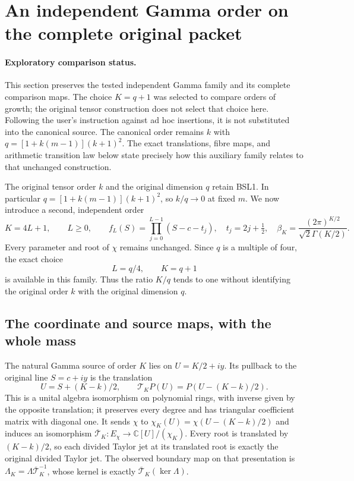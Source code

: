 \section{An independent Gamma order on the complete original packet}
\label{sec:IKO}

\paragraph{Exploratory comparison status.}
This section preserves the tested independent Gamma family and its
complete comparison maps. The choice $K=q+1$ was selected to compare
orders of growth; the original tensor construction does not select
that choice here. Following the user's instruction against ad hoc
insertions, it is not substituted into the canonical source. The
canonical order remains $k$ with $q=[1+k(m-1)](k+1)^2$.
The exact translations, fibre maps, and arithmetic transition law
below state precisely how this auxiliary family relates to that
unchanged construction.

The original tensor order $k$ and the original dimension $q$ retain
BSL1. In particular $q=[1+k(m-1)](k+1)^2$, so $k/q\to0$ at
fixed $m$. We now introduce a second, independent order
\[
 K=4L+1,\qquad L\geq0,\qquad
 f_L(S)=\prod_{j=0}^{L-1}(S-c-t_j),\quad t_j=2j+\tfrac12,
 \quad \beta_K=\frac{(2\pi)^{K/2}}{\sqrt2\Gamma(K/2)}.
 \tag{IKO1}
\]
Every parameter and root of $\chi$ remains unchanged. Since $q$ is a
multiple of four, the exact choice
\[
 L=q/4,\qquad K=q+1
 \tag{IKO2}
\]
is available in this family. Thus the ratio $K/q$ tends to one without
identifying the original order $k$ with the original dimension $q$.

\subsection{The coordinate and source maps, with the whole mass}
The natural Gamma source of order $K$ lies on $U=K/2+iy$.
Its pullback to the original line $S=c+iy$ is the translation
\[
 U=S+(K-k)/2,\qquad
 \mathcal T_KP(U)=P(U-(K-k)/2).
 \tag{IKO3}
\]
This is a unital algebra isomorphism on polynomial rings, with inverse
given by the opposite translation; it preserves every degree and has
triangular coefficient matrix with diagonal one. It sends $\chi$ to
$\chi_K(U)=\chi(U-(K-k)/2)$ and induces an isomorphism
$\overline{\mathcal T}_K:E_\chi\to\mathbb C[U]/(\chi_K)$.
Every root is translated by $(K-k)/2$, so each divided Taylor jet at
its translated root is exactly the original divided Taylor jet.
The observed boundary map on that presentation is
$\Lambda_K=\Lambda\overline{\mathcal T}_K^{-1}$, whose kernel is
exactly $\overline{\mathcal T}_K(\ker\Lambda)$.

